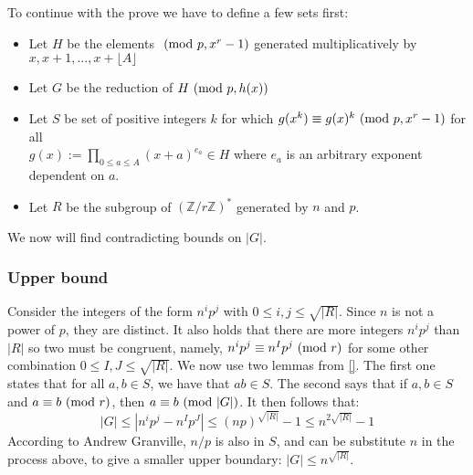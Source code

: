 \documentclass[../main.tex]{subfiles}
\begin{document}
\\\\
To continue with the prove we have to define a few sets first:
\begin{itemize}
    \item Let $H$ be the elements $\ (\mathrm{mod}\ p,x^r-1)$ generated multiplicatively by $x,x+1,...,x+\lfloor A \rfloor $
    \item Let $G$ be the reduction of $H\ (\mathrm{mod}\ p,h(x))$ 
    \item Let $S$ be set of positive integers $k$ for which $g(x^k) \equiv g(x)^k \ (\mathrm{mod}\ p,x^r-1)$ for all \\$g(x) := \prod_{0\leq a\leq A}(x+a)^{e_a}\in H$ where $e_a$ is an arbitrary exponent dependent on $a$.
    \item Let $R$ be the subgroup of $(\mathbb{Z}/r\mathbb{Z})^*$ generated by $n$ and $p$. 
\end{itemize}
We now will find contradicting bounds on $|G|$.
\subsubsection*{Upper bound}
Consider the integers of the form $n^ip^j$ with $0\leq i,j\leq \sqrt{|R|}$. Since $n$ is not a power of $p$, they are distinct. It also holds that there are more integers $n^ip^j$ than $|R|$ so two must be congruent, namely, $n^ip^j\equiv n^Ip^j \ (\mathrm{mod}\ r)$ for some other combination $0\leq I,J\leq \sqrt{|R|}$. We now use two lemmas from \ref{}. The first one states that for all $a,b\in S$, we have that $ab\in S$. The second says that if $a,b\in S$ and $a\equiv b \ (\mathrm{mod}\ r)$, then $a\equiv b \ (\mathrm{mod}\ |G|)$. It then follows that:
\begin{equation*}
    |G|\leq |n^ip^j-n^Ip^J|\leq (np)^{\sqrt{|R|}}-1\leq n^{2\sqrt{|R|}}-1
\end{equation*}
According to Andrew Granville, $n/p$ is also in $S$, and can be substitute $n$ in the process above, to give a smaller upper boundary: $|G|\leq n^{\sqrt{|R|}}$.
\end{document}
